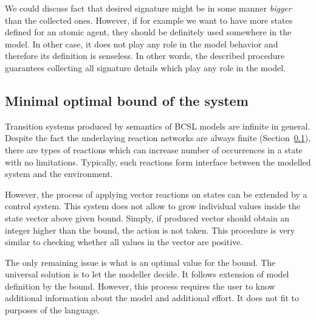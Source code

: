 \documentclass[12pt]{fithesis2}
\newcounter{counter}[section]
\renewcommand{\thecounter}{\thesection.\arabic{counter}}
\newenvironment{proof}{\bigskip\refstepcounter{counter}\noindent\textbf{Proof \thecounter}\par\nopagebreak}{\bigskip}
\newcommand*{\QEDA}{\hfill\ensuremath{\blacksquare}}%
\begin{document}
We could discuss fact that desired signature might be in some manner \emph{bigger} than the collected ones. However, if for example we want to have more states defined for an atomic agent, they should be definitely used somewhere in the model. In other case, it does not play any role in the model behavior and therefore its definition is senseless. In other words, the described procedure guarantees collecting all signature details which play any role in the model.


\subsection{Minimal optimal bound of the system}
\label{optimal_bound}

Transition systems produced by semantics of BCSL models are infinite in general. Despite the fact the underlaying reaction networks are always finite (Section~\ref{optimal_bound}), there are types of reactions which can increase number of occurrences in a state with no limitations. Typically, such reactions form interface between the modelled system and the environment.

However, the process of applying vector reactions on states can be extended by a control system. This system does not allow to grow individual values inside the state vector above given bound. Simply, if produced vector should obtain an integer higher than the bound, the action is not taken. This procedure is very similar to checking whether all values in the vector are positive.

The only remaining issue is what is an optimal value for the bound. The universal solution is to let the modeller decide. It follows extension of model definition by the bound. However, this process requires the user to know additional information about the model and additional effort. It does not fit to purposes of the language.
\end{document}
